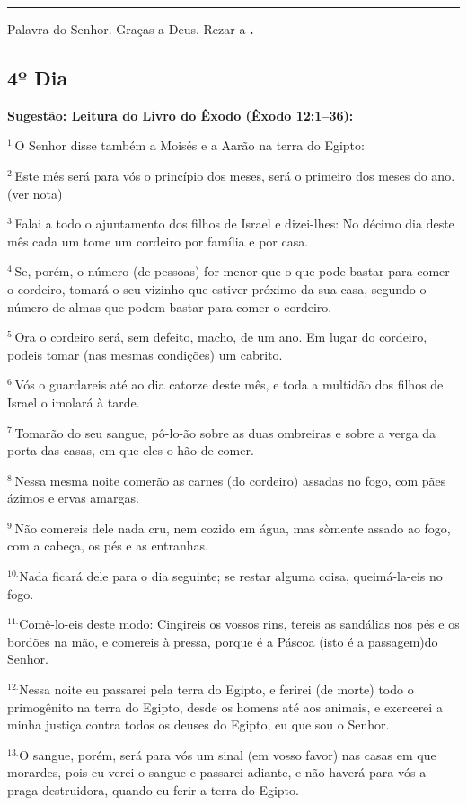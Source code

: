 \documentclass[a4paper,14pt]{extarticle} \usepackage[utf8]{inputenc}
\begin{document}
\par\noindent\rule{\textwidth}{0.4pt}

Palavra do Senhor. Graças a Deus.
Rezar a \textbf{.}
\subsection{4º Dia}
\textbf{Sugestão: Leitura do Livro do Êxodo (Êxodo 12:1–36):}

$^{1.}$O Senhor disse também a Moisés e a Aarão na terra do Egipto:

$^{2.}$Este mês será para vós o princípio dos meses, será o primeiro dos meses do ano. (ver nota)

$^{3.}$Falai a todo o ajuntamento dos filhos de Israel e dizei-lhes: No décimo dia deste mês cada um tome um cordeiro por família e por casa.

$^{4.}$Se, porém, o número (de pessoas) for menor que o que pode bastar para comer o cordeiro, tomará o seu vizinho que estiver próximo da sua casa, segundo o número de almas que podem bastar para comer o cordeiro.

$^{5.}$Ora o cordeiro será, sem defeito, macho, de um ano. Em lugar do cordeiro, podeis tomar (nas mesmas condições) um cabrito.

$^{6.}$Vós o guardareis até ao dia catorze deste mês, e toda a multidão dos filhos de Israel o imolará à tarde.

$^{7.}$Tomarão do seu sangue, pô-lo-ão sobre as duas ombreiras e sobre a verga da porta das casas, em que eles o hão-de comer.

$^{8.}$Nessa mesma noite comerão as carnes (do cordeiro) assadas no fogo, com pães ázimos e ervas amargas.

$^{9.}$Não comereis dele nada cru, nem cozido em água, mas sòmente assado ao fogo, com a cabeça, os pés e as entranhas.

$^{10.}$Nada ficará dele para o dia seguinte; se restar alguma coisa, queimá-la-eis no fogo.

$^{11.}$Comê-lo-eis deste modo: Cingireis os vossos rins, tereis as sandálias nos pés e os bordões na mão, e comereis à pressa, porque é a Páscoa (isto é a passagem)do Senhor.

$^{12.}$Nessa noite eu passarei pela terra do Egipto, e ferirei (de morte) todo o primogênito na terra do Egipto, desde os homens até aos animais, e exercerei a minha justiça contra todos os deuses do Egipto, eu que sou o Senhor.

$^{13.}$O sangue, porém, será para vós um sinal (em vosso favor) nas casas em que morardes, pois eu verei o sangue e passarei adiante, e não haverá para vós a praga destruidora, quando eu ferir a terra do Egipto.
\end{document}
